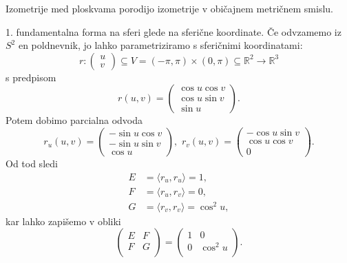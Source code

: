 \begin{opomba}
 Izometrije med ploskvama porodijo izometrije v običajnem metričnem
 smislu.
\end{opomba}

\begin{primer}
 1. fundamentalna forma na sferi glede na sferične koordinate. Če
 odvzamemo iz $S^2$ en poldnevnik, jo lahko parametriziramo s
 sferičnimi koordinatami: 
 \begin{equation*} r: \begin{pmatrix}
 	u \\ v
 \end{pmatrix} \subseteq  V = \left( -\pi, \pi \right) \times \left(
 0, \pi  \right) \subseteq  \mathbb{R}^2 \to  \mathbb{R}^3
  \end{equation*} s predpisom \begin{equation*} r(u,v) = 
\begin{pmatrix}\cos u \cos v \\ \cos u \sin v \\ \sin u
\end{pmatrix}.\end{equation*}
Potem dobimo parcialna odvoda 
\begin{equation*}   r_u(u,v) = \begin{pmatrix}-\sin u \cos v \\ -\sin u \sin v \\ \cos u
\end{pmatrix}, \,\,  r_v(u,v) = 
\begin{pmatrix}-\cos u \sin  v \\ \cos u \cos v \\ 0
\end{pmatrix}.\end{equation*}
Od tod sledi 
\begin{align*}
    E &= \langle r_u, r_u \rangle = 1, \\
    F &= \langle r_u, r_v \rangle = 0, \\
	G &= \langle r_v, r_v \rangle = \cos^2 u,
\end{align*} kar lahko zapišemo v obliki 
\begin{equation*} 
\begin{pmatrix}
	E & F \\
	F & G \\
\end{pmatrix}
=
\begin{pmatrix}
	1 & 0 \\
	0 & \cos^2 u \\
\end{pmatrix}
.
\end{equation*}
\end{primer}

